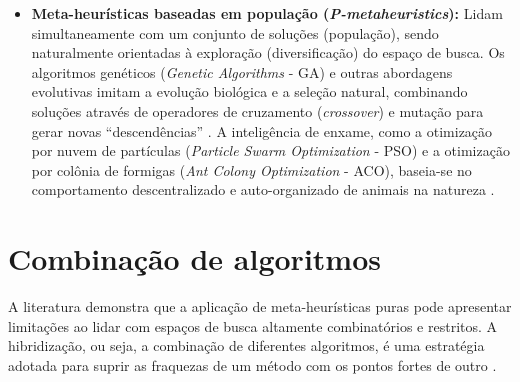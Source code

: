 \begin{itemize}
    \item \textbf{Meta-heurísticas baseadas em população (\textit{P-metaheuristics}):} Lidam simultaneamente com um conjunto de soluções (população), sendo naturalmente orientadas à exploração (diversificação) do espaço de busca. Os algoritmos genéticos (\textit{Genetic Algorithms} - GA) e outras abordagens evolutivas imitam a evolução biológica e a seleção natural, combinando soluções através de operadores de cruzamento (\textit{crossover}) e mutação para gerar novas ``descendências'' \cite{talbi2009metaheuristics, ala2022appointment}. A inteligência de enxame, como a otimização por nuvem de partículas (\textit{Particle Swarm Optimization} - PSO) e a otimização por colônia de formigas (\textit{Ant Colony Optimization} - ACO), baseia-se no comportamento descentralizado e auto-organizado de animais na natureza \cite{talbi2009metaheuristics, he2019systematic, ala2022appointment}.
\end{itemize}


\section{Combinação de algoritmos}

A literatura demonstra que a aplicação de meta-heurísticas puras pode apresentar limitações ao lidar com espaços de busca altamente combinatórios e restritos. A hibridização, ou seja, a combinação de diferentes algoritmos, é uma estratégia adotada para suprir as fraquezas de um método com os pontos fortes de outro \cite{talbi2009metaheuristics}.

